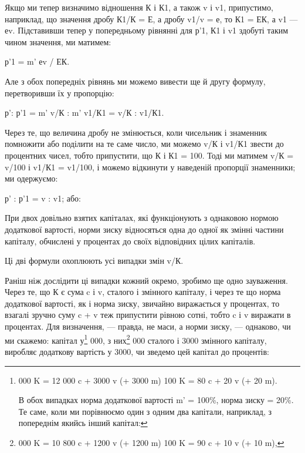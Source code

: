 Якщо ми тепер визначимо відношення К і К1, а також
v і v1, припустимо, наприклад, що значення дробу К1/К = Е, а дробу
v1/v = е, то К1 = ЕК, а v1 — еv. Підставивши тепер у попередньому
рівнянні для р'1, К1 і v1 здобуті таким чином значення,
ми матимем:

р'1 = m' еv / ЕК.

Але з обох попередніх рівнянь ми можемо вивести ще й другу
формулу, перетворивши їх у пропорцію:

р': р'1 = m' v/К : m' v1/К1 = v/К : v1/К1.

Через те, що величина дробу не змінюється, коли чисельник
і знаменник помножити або поділити на те саме число, ми можемо
v/К і v1/К1 звести до процентних чисел, тобто припустити, що
К і К1 = 100. Тоді ми матимем v/К = v/100 і v1/К1 = v1/100, і можемо відкинути
у наведеній пропорції знаменники; ми одержуємо:

р' : р'1 = v : v1; або:

При двох довільно взятих капіталах, які функціонують з однаковою
нормою додаткової вартості, норми зиску відносяться
одна до одної як змінні частини капіталу, обчислені у процентах
до своїх відповідних цілих капіталів.

Ці дві формули охоплюють усі випадки змін v/К.

Раніш ніж дослідити ці випадки кожний окремо, зробимо
ще одно зауваження. Через те, що К є сума c і v, сталого і змінного
капіталу, і через те що норма додаткової вартості, як
і норма зиску, звичайно виражається у процентах, то взагалі
зручно суму c + v теж припустити рівною сотні, тобто c і v
виражати в процентах. Для визначення, — правда, не маси, а
норми зиску, — однаково, чи ми скажемо: капітал у\footnote{
000 K = 12 000 c + 3000 v (+ 3000 m)
100 K = 80 c + 20 v (+ 20 m).

В обох випадках норма додаткової вартості m' = 100\%, норма
зиску = 20\%.
Те саме, коли ми порівнюємо один з одним два капітали,
наприклад, з попереднім якийсь інший капітал:
} 000,
з них\footnote{
000 K = 10 800 c + 1200 v (+ 1200 m)
100 K = 90 c + 10 v (+ 10 m),
} 000 сталого і 3000 змінного капіталу, виробляє додаткову
вартість у 3000, чи зведемо цей капітал до процентів:
\parbreak{}  %
